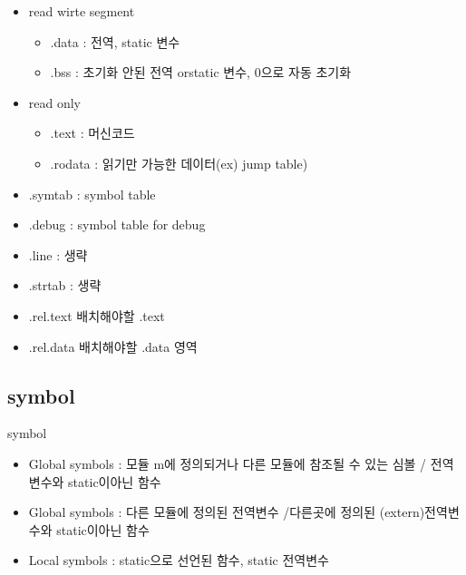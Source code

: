 \documentclass[10pt]{beamer}
\begin{document}
\begin{frame}{}
    \begin{itemize}
                    
            \item read wirte segment
            \begin{itemize}
                \item .data  :  전역, static 변수
                \item .bss : 초기화 안된 전역 orstatic 변수, 0으로 자동 초기화
            \end{itemize}
            \item read only 
            \begin{itemize}
                \item .text : 머신코드
                \item .rodata : 읽기만 가능한 데이터(ex) jump table)
            \end{itemize}

            \item .symtab : symbol table 
            \item .debug : symbol table for debug
            \item .line : 생략
            \item .strtab : 생략
            
            \item .rel.text 배치해야할 .text
            \item .rel.data 배치해야할 .data 영역

    \end{itemize}
\end{frame}    

\subsection{symbol}


\begin{frame}{symbol}
    \begin{itemize}
        \item Global symbols : 모듈 m에 정의되거나 다른 모듈에 참조될 수 있는 심볼 / 전역변수와 static이아닌 함수
        \item Global symbols : 다른 모듈에 정의된 전역변수 
        /다른곳에 정의된 (extern)전역변수와 static이아닌 함수
        \item Local symbols : static으로 선언된 함수, static 전역변수
    \end{itemize}
\end{frame}
\end{document}
